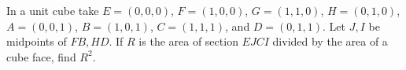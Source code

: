 In a unit cube take $E=(0,0,0)$, $F=(1,0,0)$, $G=(1,1,0)$, $H=(0,1,0)$, $A=(0,0,1)$, $B=(1,0,1)$, $C=(1,1,1)$, and $D=(0,1,1)$. Let $J,I$ be midpoints of $FB,HD$. If $R$ is the area of section $EJCI$ divided by the area of a cube face, find $R^2$.
